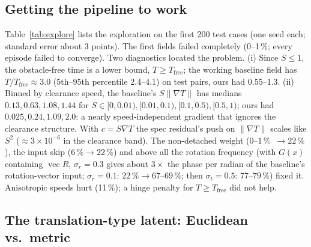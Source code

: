 \documentclass[11pt]{article}
\newcommand{\vecop}{\operatorname{vec}}
\newcommand{\pct}{\,\%}
\begin{document}
\subsection{Getting the pipeline to work}

Table~\ref{tab:explore} lists the exploration on the first 200 test cases (one seed each; standard
error about 3 points). The first fields failed completely (0--1\pct; every episode failed to converge).
Two diagnostics located the problem. (i) Since $S\le1$, the obstacle-free time is a lower bound,
$T\ge T_{\mathrm{free}}$; the working baseline field has $T/T_{\mathrm{free}}\approx3.0$ (5th--95th
percentile 2.4--4.1) on test pairs, ours had 0.55--1.3. (ii) Binned by clearance speed, the
baseline's $S\|\nabla T\|$ has medians $0.13,0.63,1.08,1.44$ for $S\in[0,0.01),[0.01,0.1),[0.1,0.5),
[0.5,1)$; ours had $0.025,0.24,1.09,2.0$: a nearly speed-independent gradient that ignores the
clearance structure. With $c=S\nabla T$ the spec residual's push on $\|\nabla T\|$ scales like $S^2$
($\approx3\times10^{-6}$ in the clearance band). The non-detached weight (0--1\pct\ $\to22\pct$), the
input skip ($6\pct\to22\pct$) and above all the rotation frequency (with $G(x)$ containing
$\vecop R$, $\sigma_r=0.3$ gives about $3\times$ the phase per radian of the baseline's rotation-vector
input; $\sigma_r=0.1$: $22\pct\to67$--$69\pct$; then $\sigma_t=0.5$: $77$--$79\pct$) fixed it.
Anisotropic speeds hurt (11\pct); a hinge penalty for $T\ge T_{\mathrm{free}}$ did not help.

\begin{table}[t]\centering\scriptsize
\caption{Stage E exploration on Tshape3d\_env1, first 200 test cases, forward MPPI. $\sigma$ column:
Fourier $\sigma_t/\sigma_r$ (single value: coordinate inputs). The last block calibrates against a
replica of the baseline pipeline and the baseline checkpoint itself.}
\label{tab:explore}
\end{table}

\subsection{The translation-type latent: Euclidean vs.\ metric}
\end{document}
